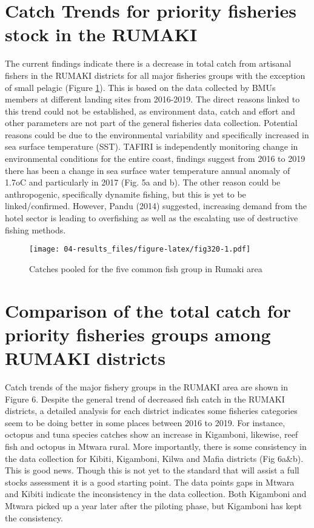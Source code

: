 \documentclass[
  12pt,
  a4paper,
  oneside]{book}
\begin{document}
\hypertarget{catch-trends-for-priority-fisheries-stock-in-the-rumaki}{%
\section{Catch Trends for priority fisheries stock in the RUMAKI}\label{catch-trends-for-priority-fisheries-stock-in-the-rumaki}}

The current findings indicate there is a decrease in total catch from artisanal fishers in the RUMAKI districts for all major fisheries groups with the exception of small pelagic (Figure \ref{fig:fig320}). This is based on the data collected by BMUs members at different landing sites from 2016-2019. The direct reasons linked to this trend could not be established, as environment data, catch and effort and other parameters are not part of the general fisheries data collection. Potential reasons could be due to the environmental variability and specifically increased in sea surface temperature (SST). TAFIRI is independently monitoring change in environmental conditions for the entire coast, findings suggest from 2016 to 2019 there has been a change in sea surface water temperature annual anomaly of 1.7oC and particularly in 2017 (Fig. 5a and b). The other reason could be anthropogenic, specifically dynamite fishing, but this is yet to be linked/confirmed. However, Pandu (2014) suggested, increasing demand from the hotel sector is leading to overfishing as well as the escalating use of destructive fishing methods.

\begin{figure}
\centering
\texttt{[image: 04-results\_files/figure-latex/fig320-1.pdf]}
\caption{\label{fig:fig320}Catches pooled for the five common fish group in Rumaki area}
\end{figure}

\hypertarget{comparison-of-the-total-catch-for-priority-fisheries-groups-among-rumaki-districts}{%
\section{Comparison of the total catch for priority fisheries groups among RUMAKI districts}\label{comparison-of-the-total-catch-for-priority-fisheries-groups-among-rumaki-districts}}

Catch trends of the major fishery groups in the RUMAKI area are shown in Figure 6. Despite the general trend of decreased fish catch in the RUMAKI districts, a detailed analysis for each district indicates some fisheries categories seem to be doing better in some places between 2016 to 2019. For instance, octopus and tuna species catches show an increase in Kigamboni, likewise, reef fish and octopus in Mtwara rural. More importantly, there is some consistency in the data collection for Kibiti, Kigamboni, Kilwa and Mafia districts (Fig 6a\&b). This is good news. Though this is not yet to the standard that will assist a full stocks assessment it is a good starting point. The data points gaps in Mtwara and Kibiti indicate the inconsistency in the data collection. Both Kigamboni and Mtwara picked up a year later after the piloting phase, but Kigamboni has kept the consistency.
\end{document}
